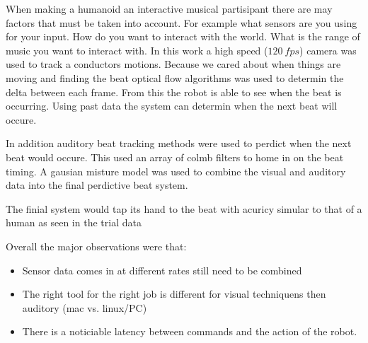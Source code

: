 When making a humanoid an interactive musical partisipant there are may factors that must be taken into account.  
For example what sensors are you using for your input.
How do you want to interact with the world.
What is the range of music you want to interact with.
In this work a high speed ($120~fps$) camera was used to track a conductors motions.
Because we cared about when things are moving and finding the beat optical flow algorithms was used to determin the delta between each frame.
From this the robot is able to see when the beat is occurring.
Using past data the system can determin when the next beat will occure.

In addition auditory beat tracking methods were used to perdict when the next beat would occure.  
This used an array of colmb filters to home in on the beat timing.
A gausian misture model was used to combine the visual and auditory data into the final perdictive beat system.

The finial system would tap its hand to the beat with acuricy simular to that of a human as seen in the trial data

Overall the major observations were that:
\begin{itemize}
\item Sensor data comes in at different rates still need to be combined
\item The right tool for the right job is different for visual techniquens then auditory (mac vs. linux/PC)
\item There is a noticiable latency between commands and the action of the robot.\end{itemize}
